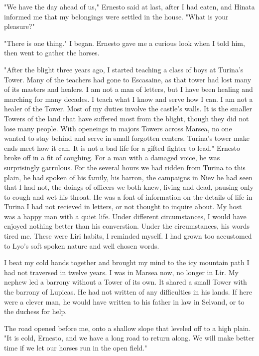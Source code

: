 \documentclass{article}
\begin{document}
"We have the day ahead of us," Ernesto said at last, after I had eaten, and Hinata informed me that my belongings were settled in the house. "What is your pleasure?"

"There is one thing." I began. Ernesto gave me a curious look when I told him, then went to gather the horses.

\vspace{.5cm}

"After the blight three years ago, I started teaching a class of boys at Turina's Tower. Many of the teachers had gone to Escasaine, as that tower had lost many of its masters and healers. I am not a man of letters, but I have been healing and marching for many decades. I teach what I know and serve how I can. I am not a healer of the Tower. Most of my duties involve the castle's walls. It is the smaller Towers of the land that have suffered most from the blight, though they did not lose many people. With openeings in majors Towers across Marsea, no one wanted to stay behind and serve in small forgotten centers. Turina's tower make ends meet how it can. It is not a bad life for a gifted fighter to lead." Ernesto broke off in a fit of coughing. For a man with a damaged voice, he was surprisingly garrulous. For the several hours we had ridden from Turina to this plain, he had spoken of his family, his barron, the campaigns in Niev he had seen that I had not, the doings of officers we both knew, living and dead, pausing only to cough and wet his throat. He was a font of information on the details of life in Turina I had not recieved in letters, or not thought to inquire about. My host was a happy man with a quiet life. Under different circumstances, I would have enjoyed nothing better than his converstion. Under the circumstances, his words tired me. These were Liri habits, I reminded myself. I had grown too accustomed to Lyo's soft spoken nature and well chosen words. 

I beat my cold hands together and brought my mind to the icy mountain path I had not traversed in twelve years. I was in Marsea now, no longer in Lir. My nephew led a barrony without a Tower of its own. It shared a small Tower with the barrony of Lupicas. He had not written of any difficulties in his lands. If here were a clever man, he would have written to his father in law in Selvand, or to the duchess for help.

The road opened before me, onto a shallow slope that leveled off to a high plain. "It is cold, Ernesto, and we have a long road to return along. We will make better time if we let our horses run in the open field." 
\end{document}
